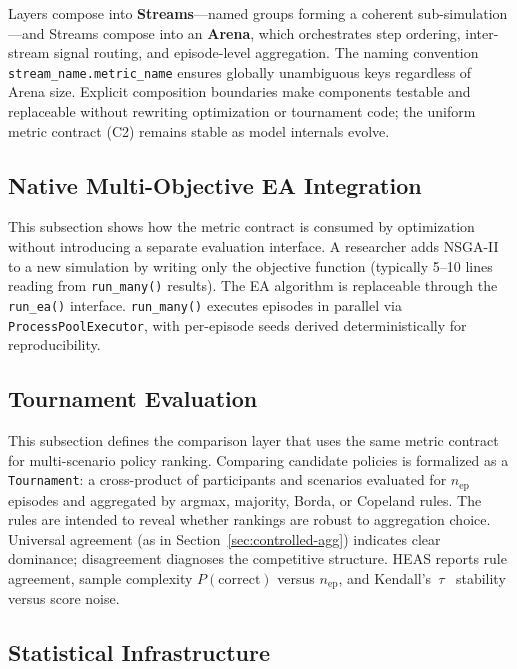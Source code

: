 \documentclass{wscpaperproc}
\begin{document}
Layers compose into \textbf{Streams}---named groups forming a coherent
sub-simulation---and Streams compose into an \textbf{Arena}, which orchestrates
step ordering, inter-stream signal routing, and episode-level aggregation. The
naming convention \texttt{stream\_name.metric\_name} ensures globally unambiguous
keys regardless of Arena size. Explicit composition boundaries make components
testable and replaceable without rewriting optimization or tournament code;
the uniform metric contract (C2) remains stable as model internals evolve.

\subsection{Native Multi-Objective EA Integration}

This subsection shows how the metric contract is consumed by optimization
without introducing a separate evaluation interface. A researcher adds
NSGA-II to a new simulation by writing only the objective function (typically
5--10 lines reading from \texttt{run\_many()} results). The EA algorithm is
replaceable through the \texttt{run\_ea()} interface. \texttt{run\_many()}
executes episodes in parallel via \texttt{ProcessPoolExecutor}, with per-episode
seeds derived deterministically for reproducibility.

\subsection{Tournament Evaluation}

This subsection defines the comparison layer that uses the same metric contract
for multi-scenario policy ranking. Comparing candidate policies is formalized as a \texttt{Tournament}: a
cross-product of participants and scenarios evaluated for $n_\text{ep}$
episodes and aggregated by argmax, majority, Borda, or Copeland rules. The
rules are intended to reveal whether rankings are robust to aggregation choice.
Universal agreement (as in Section~\ref{sec:controlled-agg}) indicates clear dominance;
disagreement diagnoses the competitive structure.
HEAS reports rule agreement, sample complexity $P(\text{correct})$ versus
$n_\text{ep}$, and Kendall's~$\tau$~\cite{kendall1938new} stability versus
score noise.

\subsection{Statistical Infrastructure}
\end{document}
